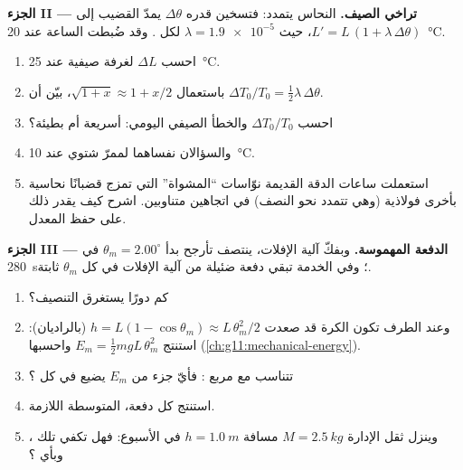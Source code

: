 \begin{problem}
\medskip
\noindent\textbf{الجزء II --- تراخي الصيف.} النحاس يتمدد: فتسخين
قدره $\Delta\theta$ يمدّ القضيب إلى $L' = L\,(1 + \lambda\,
\Delta\theta)$، حيث $\lambda = \num{1.9e-5}$ لكل . وقد ضُبطت الساعة
عند \qty{20}{\celsius}.
\begin{enumerate}[resume]
  \item احسب $\Delta L$ لغرفة صيفية عند \qty{25}{\celsius}.
  \item باستعمال $\sqrt{1+x} \approx 1 + x/2$، بيّن أن
        $\Delta T_0 / T_0 = \tfrac12 \lambda\, \Delta\theta$.
  \item احسب $\Delta T_0/T_0$ والخطأ الصيفي اليومي: أسريعة أم بطيئة؟
  \item والسؤالان نفساهما لممرّ شتوي عند \qty{10}{\celsius}.
  \item استعملت ساعات الدقة القديمة نوّاسات ``المشواة'' التي تمزج قضبانًا
        نحاسية بأخرى فولاذية (وهي تتمدد نحو النصف) في اتجاهين
        متناوبين. اشرح كيف يقدر ذلك على حفظ المعدل.
\end{enumerate}

\medskip
\noindent\textbf{الجزء III --- الدفعة المهموسة.} وبفكّ آلية
الإفلات، ينتصف تأرجح بدأ  $\theta_m = 2.00^\circ$
في \qty{280}{s}؛ وفي الخدمة تبقي دفعة ضئيلة من
آلية الإفلات في كل  $\theta_m$ ثابتة.
\begin{enumerate}[resume]
  \item كم دورًا يستغرق التنصيف؟
  \item وعند الطرف تكون الكرة قد صعدت $h = L(1 - \cos\theta_m)
        \approx L\,\theta_m^2/2$ (بالراديان): استنتج $E_m = \tfrac12
        m g L\,\theta_m^2$ واحسبها
        (\cref{ch:g11:mechanical-energy}).
  \item {} تتناسب مع مربع : فأيّ جزء من
        $E_m$ يضيع في كل ؟
  \item استنتج  كل دفعة،  المتوسطة اللازمة.
  \item وينزل ثقل الإدارة $M = \qty{2.5}{kg}$ مسافة $h =
        \qty{1.0}{m}$ في الأسبوع: فهل تكفي تلك ، وبأي ؟
\end{enumerate}


\end{problem}
